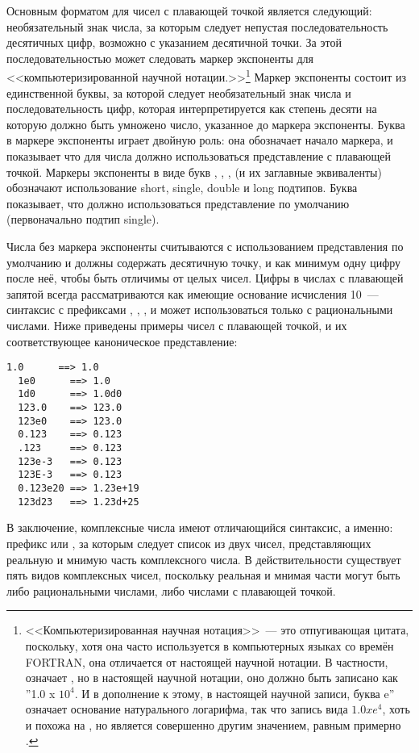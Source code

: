 Основным форматом для чисел с плавающей точкой является следующий: необязательный знак
числа, за которым следует непустая последовательность десятичных цифр, возможно с
указанием десятичной точки.  За этой последовательностью может следовать маркер экспоненты
для <<компьютеризированной научной нотации.>>\footnote{<<Компьютеризированная научная
  нотация>>~--- это отпугивающая цитата, поскольку, хотя она часто используется в
  компьютерных языках со времён FORTRAN, она отличается от настоящей научной нотации.  В
  частности,  означает , но в настоящей научной нотации, оно
  должно быть записано как ''1.0 x $10^4$.  И в дополнение к этому, в настоящей научной
  записи, буква e'' означает основание натурального логарифма, так что запись вида $1.0 x
  e^4$, хоть и похожа на , но является совершенно другим значением, равным
  примерно .}  Маркер экспоненты состоит из единственной буквы, за которой
следует необязательный знак числа и последовательность цифр, которая интерпретируется как
степень десяти на которую должно быть умножено число, указанное до маркера экспоненты.
Буква в маркере экспоненты играет двойную роль: она обозначает начало маркера, и
показывает что для числа должно использоваться представление с плавающей точкой.  Маркеры
экспоненты в виде букв , , ,  (и их заглавные эквиваленты)
обозначают использование short, single, double и long подтипов.  Буква 
показывает, что должно использоваться представление по умолчанию (первоначально подтип
single).

Числа без маркера экспоненты считываются с использованием представления по умолчанию и
должны содержать десятичную точку, и как минимум одну цифру после неё, чтобы быть отличимы
от целых чисел.  Цифры в числах с плавающей запятой всегда рассматриваются как имеющие
основание исчисления 10~--- синтаксис с префиксами , , , и
 может использоваться только с рациональными числами.  Ниже приведены примеры
чисел с плавающей точкой, и их соответствующее каноническое представление:

\begin{lstlisting}[style=lisprepl]
  1.0      ==> 1.0
  1e0      ==> 1.0
  1d0      ==> 1.0d0
  123.0    ==> 123.0
  123e0    ==> 123.0
  0.123    ==> 0.123
  .123     ==> 0.123
  123e-3   ==> 0.123
  123E-3   ==> 0.123
  0.123e20 ==> 1.23e+19
  123d23   ==> 1.23d+25
\end{lstlisting}

В заключение, комплексные числа имеют отличающийся синтаксис, а именно: префикс 
или , за которым следует список из двух чисел, представляющих реальную и мнимую
часть комплексного числа.  В действительности существует пять видов комплексных чисел,
поскольку реальная и мнимая части могут быть либо рациональными числами, либо числами с
плавающей точкой.


